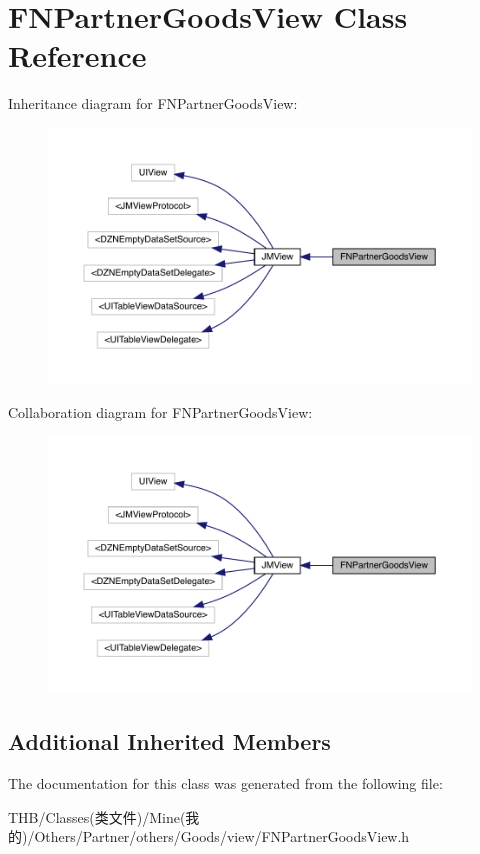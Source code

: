 \hypertarget{interface_f_n_partner_goods_view}{}\section{F\+N\+Partner\+Goods\+View Class Reference}
\label{interface_f_n_partner_goods_view}


Inheritance diagram for F\+N\+Partner\+Goods\+View\+:\nopagebreak
\begin{figure}[H]
\begin{center}
\leavevmode
\includegraphics[width=350pt]{interface_f_n_partner_goods_view__inherit__graph}
\end{center}
\end{figure}


Collaboration diagram for F\+N\+Partner\+Goods\+View\+:\nopagebreak
\begin{figure}[H]
\begin{center}
\leavevmode
\includegraphics[width=350pt]{interface_f_n_partner_goods_view__coll__graph}
\end{center}
\end{figure}
\subsection*{Additional Inherited Members}


The documentation for this class was generated from the following file\+:\begin{DoxyCompactItemize}
\item 
T\+H\+B/\+Classes(类文件)/\+Mine(我的)/\+Others/\+Partner/others/\+Goods/view/F\+N\+Partner\+Goods\+View.\+h\end{DoxyCompactItemize}
